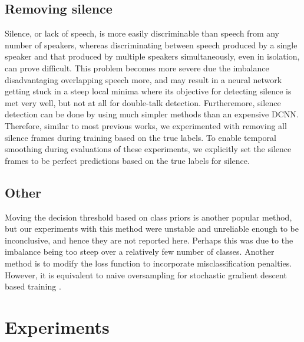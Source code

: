 \documentclass[a4paper]{article}
\begin{document}
\subsection{Removing silence} \label{sec:rm-silence}
Silence, or lack of speech, is more easily discriminable than speech from any number of speakers,
whereas discriminating between speech produced by a single speaker and that produced by multiple speakers simultaneously, even in isolation, can prove difficult.
This problem becomes more severe due the imbalance disadvantaging overlapping speech more,
and may result in a neural network getting stuck in a steep local minima where its objective for detecting silence is met very well, but not at all for double-talk detection.
Furtheremore, silence detection can be done by using much simpler methods than an expensive DCNN.
Therefore, similar to most previous works,
we experimented with removing all silence frames during training based on the true labels.
To enable temporal smoothing during evaluations of these experiments,
we explicitly set the silence frames to be perfect predictions based on the true labels for silence.

\subsection{Other}
Moving the decision threshold based on class priors is another popular method,
but our experiments with this method were unstable and unreliable enough to be inconclusive,
and hence they are not reported here.
Perhaps this was due to the imbalance being too steep over a relatively few number of classes.
Another method is to modify the loss function to incorporate misclassification penalties.
However, it is equivalent to naive oversampling for stochastic gradient descent based training \cite{Budasystematicstudyclass2017}.

\section{Experiments} \label{sec:eval}
\end{document}
